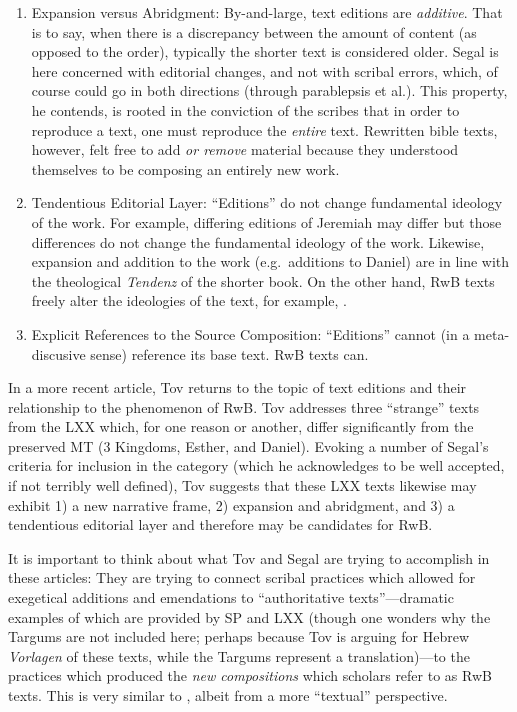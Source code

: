 \begin{enumerate}
    \item Expansion versus Abridgment: By-and-large, text editions are \emph{additive}. That is to say, when there is a discrepancy between the amount of content (as opposed to the order), typically the shorter text is considered older. Segal is here concerned with editorial changes, and not with scribal errors, which, of course could go in both directions (through parablepsis et al.). This property, he contends, is rooted in the conviction of the scribes that in order to reproduce a text, one must reproduce the \emph{entire} text.\autocite[24]{segal_henze2005} Rewritten bible texts, however, felt free to add \emph{or remove} material because they understood themselves to be composing an entirely new work.\autocite[24]{segal_henze2005} 

    \item Tendentious Editorial Layer: ``Editions'' do not change fundamental ideology of the work. For example, differing editions of Jeremiah may differ but those differences do not change the fundamental ideology of the work. Likewise, expansion and addition to the work (e.g.~additions to Daniel) are in line with the theological \emph{Tendenz} of the shorter book. On the other hand, RwB texts freely alter the ideologies of the text, for example, \jub.\autocite[25]{segal_henze2005}

    \item Explicit References to the Source Composition: ``Editions'' cannot (in   a meta-discusive sense) reference its base text. RwB texts can.
\end{enumerate} 

In a more recent article, Tov returns to the topic of text editions and their relationship to the phenomenon of RwB\autocite{tov_krarrer-kraus2008}. Tov addresses three ``strange'' texts from the LXX which, for one reason or another, differ significantly from the preserved MT (3 Kingdoms, Esther, and Daniel). Evoking a number of Segal's criteria\autocite{segal_henze2005} for inclusion in the category (which he acknowledges to be well accepted, if not terribly well defined), Tov suggests that these LXX texts likewise may exhibit 1) a new narrative frame, 2) expansion and abridgment, and 3) a tendentious editorial layer and therefore may be candidates for RwB. 

It is important to think about what Tov and Segal are trying to accomplish in these articles: They are trying to connect scribal practices which allowed for exegetical additions and emendations to ``authoritative texts''---dramatic examples of which are provided by SP and LXX (though one wonders why the Targums are not included here; perhaps because Tov is arguing for Hebrew \emph{Vorlagen} of these texts, while the Targums represent a translation)---to the practices which produced the \emph{new compositions} which scholars refer to as RwB texts. This is very similar to \vermes, albeit from a more ``textual'' perspective. 

